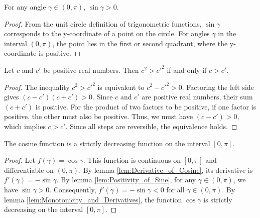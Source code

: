 \begin{lemma}
    \label{lem:Positivity_of_Sine}
    For any angle $\gamma \in (0, \pi)$, $\sin \gamma > 0$.
\end{lemma}

\begin{proof}
    From the unit circle definition of trigonometric functions, $\sin \gamma$ corresponds to the y-coordinate of a point on the circle. For angles $\gamma$ in the interval $(0, \pi)$, the point lies in the first or second quadrant, where the y-coordinate is positive.
\end{proof}

\begin{lemma}
    \label{lem:Order_Preservation_Squaring}
    Let $c$ and $c'$ be positive real numbers. Then $c^2 > c'^2$ if and only if $c > c'$.
\end{lemma}

\begin{proof}
    The inequality $c^2 > c'^2$ is equivalent to $c^2 - c'^2 > 0$. Factoring the left side gives $(c - c')(c + c') > 0$. Since $c$ and $c'$ are positive real numbers, their sum $(c + c')$ is positive. For the product of two factors to be positive, if one factor is positive, the other must also be positive. Thus, we must have $(c - c') > 0$, which implies $c > c'$. Since all steps are reversible, the equivalence holds.
\end{proof}

\begin{lemma}
    \label{lem:Monotonicity_of_Cosine}
    The cosine function is a strictly decreasing function on the interval $[0, \pi]$.
\end{lemma}

\begin{proof}
    Let $f(\gamma) = \cos \gamma$. This function is continuous on $[0, \pi]$ and differentiable on $(0, \pi)$. By lemma \ref{lem:Derivative_of_Cosine}, its derivative is $f'(\gamma) = -\sin \gamma$. By lemma \ref{lem:Positivity_of_Sine}, for any $\gamma \in (0, \pi)$, we have $\sin \gamma > 0$. Consequently, $f'(\gamma) = -\sin \gamma < 0$ for all $\gamma \in (0, \pi)$. By lemma \ref{lem:Monotonicity_and_Derivatives}, the function $\cos \gamma$ is strictly decreasing on the interval $[0, \pi]$.
\end{proof}

